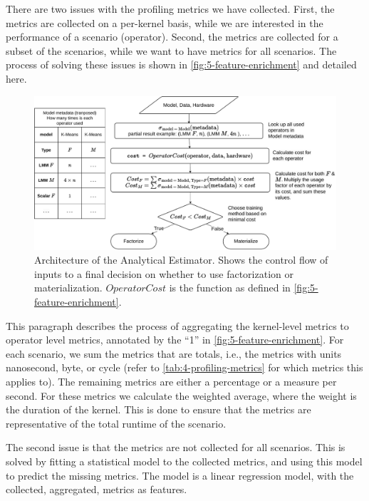 There are two issues with the profiling metrics we have collected. First, the metrics are collected on a per-kernel basis, while we are interested in the performance of a scenario (operator). Second, the metrics are collected for a subset of the scenarios, while we want to have metrics for all scenarios. The process of solving these issues is shown in \autoref{fig:5-feature-enrichment} and detailed here.

\begin{figure}[ht]
    \centering
    \includegraphics[width=\linewidth]{chapters/05_cost_estimation/figures/analytical-architecture.pdf}
    \caption[Analytical Estimator Architecture]{Architecture of the Analytical Estimator. Shows the control flow of inputs to a final decision on whether to use factorization or materialization. $OperatorCost$ is the function as defined in \autoref{fig:5-feature-enrichment}.}
    \label{fig:5-analytical-architecture}
\end{figure}

This paragraph describes the process of aggregating the kernel-level metrics to operator level metrics, annotated by the “1” in \autoref{fig:5-feature-enrichment}. For each scenario, we sum the metrics that are totals, i.e., the metrics with units nanosecond, byte, or cycle (refer to \autoref{tab:4-profiling-metrics} for which metrics this applies to). The remaining metrics are either a percentage or a measure per second. For these metrics we calculate the weighted average, where the weight is the duration of the kernel. This is done to ensure that the metrics are representative of the total runtime of the scenario.

The second issue is that the metrics are not collected for all scenarios. This is solved by fitting a statistical model to the collected metrics, and using this model to predict the missing metrics. The model is a linear regression model, with the collected, aggregated, metrics as features.

